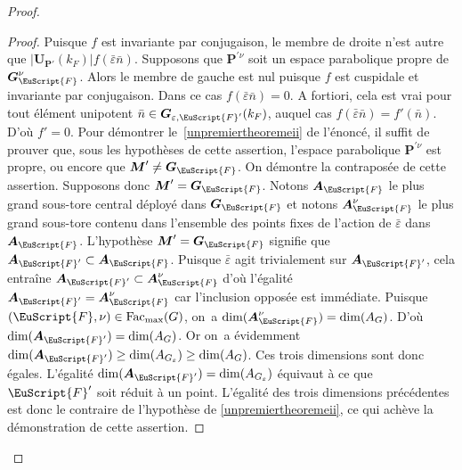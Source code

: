 \documentclass[JEP,XML,SOM,Unicode,francais]{cedram}
\let\mathcal \EuScript
\let\epsilon\varepsilon
\newcommand{\Fac}{\mathrm{Fac}}
\newcommand{\bA}{\boldsymbol{A}}
\newcommand{\bG}{\boldsymbol{G}}
\newcommand{\bM}{\boldsymbol{M}}
\newcommand{\bP}{\boldsymbol{P}}
\newcommand{\bU}{\boldsymbol{U}}
\newcommand{\cF}{\mathcal{F}}
\theoremstyle{plain}
\theoremstyle{definition}
\begin{document}
\begin{proof}
\begin{proof}
Puisque $f$ est invariante par conjugaison, le membre de droite n'est autre que $\vert \bU_{\bP'}(k_{F})\vert f(\bar{\epsilon}\bar{n})$. Supposons que $\bP^{\prime\nu}$ soit un espace parabolique propre de $\bG_{\cF}^{\nu}$. Alors le membre de gauche est nul puisque $f$ est cuspidale et invariante par conjugaison. Dans ce cas $f(\bar{\epsilon}\bar{n})=0$. A fortiori, cela est vrai pour tout élément unipotent $\bar{n}\in \bG_{\epsilon,\cF'}(k_{F})$, auquel cas $f(\bar{\epsilon}\bar{n})=f'(\bar{n})$. D'où $f'=0$. Pour démontrer le~\eqref{unpremiertheoremeii} de l'énoncé, il suffit de prouver que, sous les hypothèses de cette assertion, l'espace parabolique $\bP^{\prime\nu}$ est propre, ou encore que $\bM'\neq\bG_{\cF}$. On démontre la contraposée de cette assertion. Supposons donc $\bM'=\bG_{\cF}$. Notons $\bA_{\cF}$ le plus grand sous-tore central déployé dans $\bG_{\cF}$ et notons $\bA_{\cF}^{\nu}$ le plus grand sous-tore contenu dans l'ensemble des points fixes de l'action de $\bar{\epsilon}$ dans $\bA_{\cF}$. L'hypothèse $\bM'=\bG_{\cF}$ signifie que $\bA_{\cF'}\subset \bA_{\cF}$. Puisque $\bar{\epsilon}$ agit trivialement sur $\bA_{\cF'}$, cela entraîne $\bA_{\cF'}\subset \bA_{\cF}^{\nu}$ d'où l'égalité $\bA_{\cF'}= \bA_{\cF}^{\nu}$ car l'inclusion opposée est immédiate. Puisque $(\cF,\nu)\in \Fac_{\max}(G)$, on~a $\dim( \bA_{\cF}^{\nu})=\dim(A_{G})$. D'où $\dim(\bA_{\cF'})=\dim(A_{G})$. Or on~a évidemment $\dim(\bA_{\cF'})\geq \dim(A_{G_{\epsilon}})\geq \dim(A_{G})$. Ces trois dimensions sont donc égales. L'égalité $\dim(\bA_{\cF'})= \dim(A_{G_{\epsilon}})$ équivaut à ce que $\cF'$ soit réduit à un point. L'égalité des trois dimensions précédentes est donc le contraire de l'hypothèse de \eqref{unpremiertheoremeii}, ce qui achève la démonstration de cette assertion.


\end{proof}
\end{proof}
\end{document}
